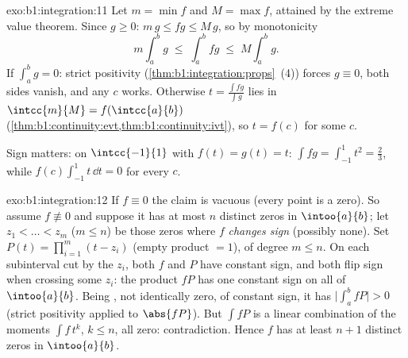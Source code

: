 \begin{solution}{exo:b1:integration:11}
Let $m = \min f$ and $M = \max f$, attained by the extreme value
theorem. Since $g \geq 0$: $m\,g \leq fg \leq M\,g$, so by
monotonicity
\[
m \int_a^b g \;\leq\; \int_a^b fg \;\leq\; M \int_a^b g .
\]
If $\int_a^b g = 0$: strict positivity
(\cref{thm:b1:integration:props}~(4)) forces $g \equiv 0$, both
sides vanish, and any $c$ works. Otherwise $t = \frac{\int
fg}{\int g}$ lies in $\intcc{m}{M} = f(\intcc{a}{b})$
(\cref{thm:b1:continuity:evt,thm:b1:continuity:ivt}), so $t =
f(c)$ for some $c$.

Sign matters: on $\intcc{-1}{1}$ with $f(t) = g(t) = t$: $\int
fg = \int_{-1}^1 t^2 = \frac23$, while $f(c)\int_{-1}^1 t\,\dd t
= 0$ for every $c$.
\end{solution}

\begin{solution}{exo:b1:integration:12}
If $f \equiv 0$ the claim is vacuous (every point is a zero). So
assume $f \not\equiv 0$ and suppose it has at most $n$ distinct
zeros in $\intoo{a}{b}$; let $z_1 < \dots < z_m$ ($m \leq n$) be
those zeros where $f$ \emph{changes sign} (possibly none). Set
$P(t) = \prod_{i=1}^{m}(t - z_i)$ (empty product $= 1$), of
degree $m \leq n$. On each subinterval cut by the $z_i$, both
$f$ and $P$ have constant sign, and both flip sign when crossing
some $z_i$: the product $fP$ has one constant sign on all of
$\intoo{a}{b}$. Being , not identically zero, of
constant sign, it has $\bigl|\int_a^b fP\bigr| > 0$ (strict
positivity applied to $\abs{fP}$). But $\int f P$ is a linear
combination of the moments $\int f\,t^k$, $k \leq n$, all zero:
contradiction. Hence $f$ has at least $n + 1$ distinct zeros in
$\intoo{a}{b}$.
\end{solution}

